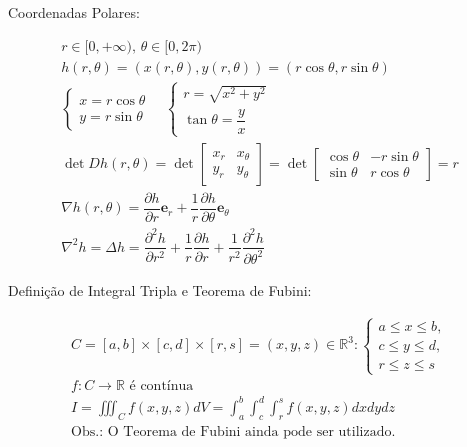 	\begin{large}
	
	Coordenadas Polares:
	\end{large}
	\begin{gather*}
	r\in[0,+\infty), \,\theta\in[0,2\pi)\\
	h(r,\theta) = (x(r,\theta),y(r,\theta))=(r\cos\theta,r\sin\theta)\\
	\begin{cases}
	x=r\cos\theta \\
	y=r\sin\theta	
	\end{cases}\hspace{12pt}
	\begin{cases}
	r=\sqrt{x^2+y^2}\\
	\tan\theta=\dfrac{y}{x}	
	\end{cases}\\
	\det Dh(r,\theta)=\det\begin{bmatrix}
	x_r & x_\theta \\
	y_r & y_\theta
	\end{bmatrix}=\det\begin{bmatrix}
	\cos\theta & -r\sin\theta \\
	\sin\theta & r\cos\theta
	\end{bmatrix} = r \\
    \nabla h(r, \theta) = \dfrac{\partial h}{\partial r} \mathbf{e}_r + \dfrac{1}{r}\dfrac{\partial h}{\partial \theta}\mathbf{e}_\theta\\
    \nabla^2 h = \Delta h = \dfrac{\partial^2 h}{\partial r^2} + \dfrac{1}{r}\dfrac{\partial h}{\partial r} + \dfrac{1}{r^2}\dfrac{\partial^2 h}{\partial \theta^2}
    \end{gather*}
	
	\begin{large}
	Definição de Integral Tripla e Teorema de Fubini:
	\end{large}		
	\begin{gather*}
	\mathit{C}=[a,b]\times [c,d] \times [r,s] = (x,y,z)\in\mathbb{R}^3: \begin{cases} a\leq x\leq b, \\ c \leq y\leq d, \\ r\leq z\leq s
	\end{cases}	\\
	f:\textit{C}\to\mathbb{R} \text{ é contínua}\\
	I=\displaystyle\iiint_{\mathit{C}}f(x,y,z)dV=\displaystyle\int_a^b\displaystyle\int_c^d
	\displaystyle\int_r^sf(x,y,z)dxdydz \\
	\text{Obs.: O Teorema de Fubini ainda pode ser utilizado.}
	\end{gather*}

